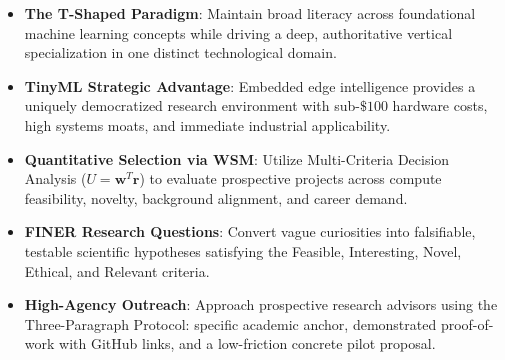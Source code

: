 \begin{takeaways}
\begin{itemize}
    \item \textbf{The T-Shaped Paradigm}: Maintain broad literacy across foundational machine learning concepts while driving a deep, authoritative vertical specialization in one distinct technological domain.
    \item \textbf{TinyML Strategic Advantage}: Embedded edge intelligence provides a uniquely democratized research environment with sub-$\$100$ hardware costs, high systems moats, and immediate industrial applicability.
    \item \textbf{Quantitative Selection via WSM}: Utilize Multi-Criteria Decision Analysis ($U = \mathbf{w}^T \mathbf{r}$) to evaluate prospective projects across compute feasibility, novelty, background alignment, and career demand.
    \item \textbf{FINER Research Questions}: Convert vague curiosities into falsifiable, testable scientific hypotheses satisfying the Feasible, Interesting, Novel, Ethical, and Relevant criteria.
    \item \textbf{High-Agency Outreach}: Approach prospective research advisors using the Three-Paragraph Protocol: specific academic anchor, demonstrated proof-of-work with GitHub links, and a low-friction concrete pilot proposal.
\end{itemize}
\end{takeaways}

